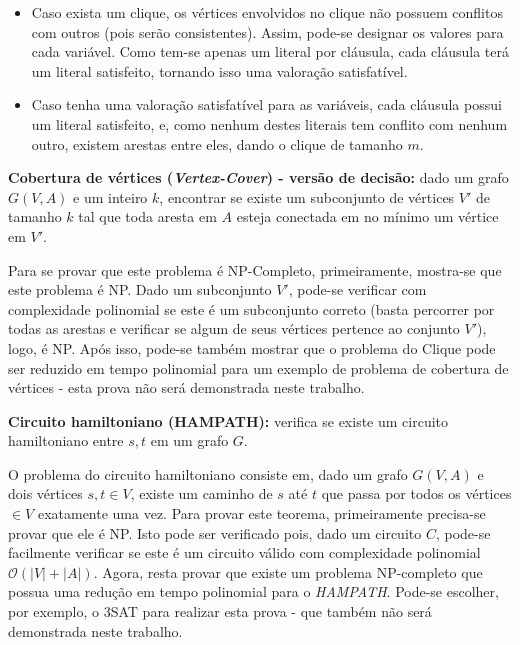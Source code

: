 \begin{itemize}
    \item Caso exista um clique, os vértices envolvidos no clique não possuem conflitos com outros (pois serão consistentes). Assim, pode-se designar os valores para cada variável. Como tem-se apenas um literal por cláusula, cada cláusula terá um literal satisfeito, tornando isso uma valoração satisfatível.
    \item Caso tenha uma valoração satisfatível para as variáveis, cada cláusula possui um literal satisfeito, e, como nenhum destes literais tem conflito com nenhum outro, existem arestas entre eles, dando o clique de tamanho $m$.
\end{itemize}

\begin{trivlist}
\item \textbf{Cobertura de vértices (\textit{Vertex-Cover}) - versão de decisão:} dado um grafo $G(V, A)$ e um inteiro $k$, encontrar se existe um subconjunto de vértices $V'$ de tamanho $k$ tal que toda aresta em $A$ esteja conectada em no mínimo um vértice em $V'$.
\end{trivlist}

Para se provar que este problema é NP-Completo, primeiramente, mostra-se que este problema é NP. Dado um subconjunto $V'$, pode-se verificar com complexidade polinomial se este é um subconjunto correto (basta percorrer por todas as arestas e verificar se algum de seus vértices pertence ao conjunto $V'$), logo, é NP. Após isso, pode-se também mostrar que o problema do Clique pode ser reduzido em tempo polinomial para um exemplo de problema de cobertura de vértices - esta prova não será demonstrada neste trabalho.

\begin{trivlist}
\item \textbf{Circuito hamiltoniano (HAMPATH):} verifica se existe um circuito hamiltoniano entre $s, t$ em um grafo $G$.
\end{trivlist}

O problema do circuito hamiltoniano consiste em, dado um grafo $G(V, A)$ e dois vértices $s, t \in V$, existe um caminho de $s$ até $t$ que passa por todos os vértices $\in V$ exatamente uma vez. Para provar este teorema, primeiramente precisa-se provar que ele é NP. Isto pode ser verificado pois, dado um circuito $C$, pode-se facilmente verificar se este é um circuito válido com complexidade polinomial $\mathcal{O}(|V| + |A|)$. Agora, resta provar que existe um problema NP-completo que possua uma redução em tempo polinomial para o \textit{HAMPATH}. Pode-se escolher, por exemplo, o 3SAT para realizar esta prova - que também não será demonstrada neste trabalho.

